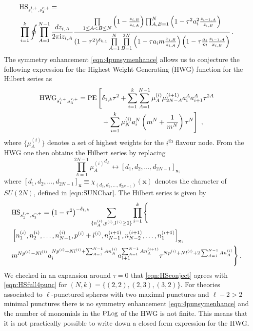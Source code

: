 \documentclass[main.tex]{subfiles}
\begin{document}
\begin{equation}\label{eqn:HSfull4punc}
\begin{aligned}
&\textrm{HS}_{s^{l,+}_1,s^{r,+}_{3}}=\\
&\prod_{i=1}^k\oint\prod_{A=1}^{N-1}\frac{dz_{i,A}}{2\pi\mathrm{i} z_{i,A}}\frac{\prod\limits_{1\leq A<B\leq N}\left(1-\frac{z_{i,B}}{z_{i,A}}\right)\prod_{A,B=1}^N\left(1-\tau^2a_i^2\frac{z_{i-1,A}}{z_{i,B}}\right)}{(1-\tau^2)^{\delta_{k,1}}\prod\limits_{A=1}^N\prod\limits_{B=1}^{2N}\left(1-\tau a_im\frac{x_{i,B}}{z_{i,A}}\right)\left(1-\tau\frac{a_i}{m}\frac{z_{i-1,A}}{x_{i,B}}\right)}\,.
\end{aligned}
\end{equation}
The symmetry enhancement \eqref{eqn:4punsymenhance} allows us to conjecture the following expression for the Highest Weight Generating (HWG) function for the Hilbert series as
\begin{equation}
\begin{aligned}
\mathrm{HWG}_{s^{l,+}_1,s^{r,+}_{3}}=\operatorname{\mathrm{PE}}\Bigg[&\delta_{1,k}\tau^2+\sum_{i=1}^k\sum_{A=1}^{N-1}\mu^{(i)}_{A}\mu^{(i+1)}_{2N-A}a_i^Aa_{i+1}^A\tau^{2A}\\
&+\sum_{i=1}^k\mu^{(i)}_{N}a_i^{N}\left(m^{N}+\frac{1}{m^N}\right)\tau^N\Bigg]\, \ ,
\end{aligned}
\end{equation}
where $\{\mu_{A}^{(i)}\}$ denotes a set of highest weights for the $i^{\text{th}}$ flavour node.
From the HWG one then obtains the Hilbert series by replacing 
\begin{equation}
\prod_{A=1}^{2N-1}{\mu^{(i)}_A}^{d_A}\leftrightarrow[d_1,d_2,\dots,d_{2N-1}]_{\mathbf{x}_i}
\end{equation}
where $[d_1,d_2,\dots,d_{2N-1}]_{\mathbf{x}}\equiv\chi_{(d_1,d_2,\dots,d_{2N-1})}(\mathbf{x})$ denotes the character of $SU(2N)$, defined in \eqref{eqn:SUNChar}.
The Hilbert series is given by
\begin{equation}\label{eqn:HSconject}
\begin{aligned}
& \textrm{HS}_{s^{l,+}_1,s^{r,+}_{3}}=\left(1-\tau^2\right)^{-\delta_{1,k}}\sum_{\{n^{(i)}_{A},p^{(i)},l^{(i)}\geq0\}}\prod_{i=1}^k\Bigg\{\\
&\left[n^{(i)}_{1},n^{(i)}_{2},\dots,n^{(i)}_{N-1},p^{(i)}+l^{(i)},n^{(i+1)}_{N-1},n^{(i+1)}_{N-2},\dots,n^{(i+1)}_{1}\right]_{\mathbf{x}_i}\\
& m^{Np^{(i)}-Nl^{(i)}}a_i^{Np^{(i)}+Nl^{(i)}+\sum_{A=1}^{N-1}An_{A}^{(i)}}a_{i+1}^{\sum_{A=1}^{N-1}An_{A}^{(i+1)}}\tau^{Np^{(i)}+Nl^{(i)}+2\sum_{A=1}^{N-1}An^{(i)}_{A}}\Bigg\}\,.
\end{aligned}
\end{equation}
We checked in an expansion around $\tau=0$ that \eqref{eqn:HSconject} agrees with \eqref{eqn:HSfull4punc} for $(N,k)=\{(2,2),(2,3),(3,2)\}$. For theories associated to $\ell$-punctured spheres with two maximal punctures and $\ell-2>2$ minimal punctures there is no symmetry enhancement \eqref{eqn:4punsymenhance} and the number of monomials in the $\operatorname{\mathrm{PLog}}$ of the HWG is not finite. This means that it is not practically possible to write down a closed form expression for the HWG. 
\end{document}
